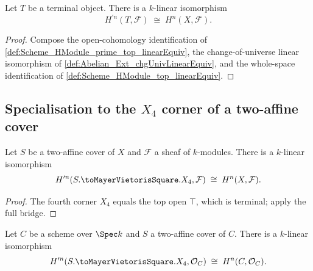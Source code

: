 \begin{definition}\leanok
  \label{def:Scheme_HModule_prime_eq_HModule_linearEquiv}

  Let \(T\) be a terminal object. There is a \(k\)-linear isomorphism
  \[
    H^{\prime n}(T, \mathcal F) \;\cong\; H^{n}(X, \mathcal F).
  \]
\end{definition}

\begin{proof}


\leanok
  Compose the open-cohomology identification of \cref{def:Scheme_HModule_prime_top_linearEquiv}, the change-of-universe linear isomorphism of \cref{def:Abelian_Ext_chgUnivLinearEquiv}, and the whole-space identification of \cref{def:Scheme_HModule_top_linearEquiv}.
\end{proof}

\subsection{Specialisation to the \(X_4\) corner of a two-affine cover}

\begin{definition}\leanok
  \label{def:Scheme_AffineCoverMVSquare_HModule_prime_X4_linearEquiv}

  Let \(S\) be a two-affine cover of \(X\) and \(\mathcal F\) a sheaf of \(k\)-modules. There is a \(k\)-linear isomorphism
  \[
    H^{\prime n}(S.\toMayerVietorisSquare.X_4, \mathcal F) \;\cong\; H^{n}(X, \mathcal F).
  \]
\end{definition}

\begin{proof}


\leanok
  The fourth corner \(X_4\) equals the top open \(\top\), which is terminal; apply the full bridge.
\end{proof}

\begin{definition}\leanok
  \label{def:Scheme_AffineCoverMVSquare_HModule_prime_X4_linearEquiv_curve}

  Let \(C\) be a scheme over \(\Spec k\) and \(S\) a two-affine cover of \(C\). There is a \(k\)-linear isomorphism
  \[
    H^{\prime n}(S.\toMayerVietorisSquare.X_4, \mathcal O_C) \;\cong\; H^{n}(C, \mathcal O_C).
  \]
\end{definition}

